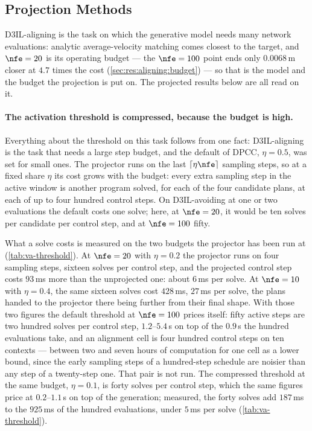 \subsection{Projection Methods}\label{sec:res:aligning:projection}

D3IL-aligning is the task on which the generative model needs many network evaluations: analytic
average-velocity matching comes closest to the target, and $\nfe=20$ is its operating budget --- the
$\nfe=100$ point ends only $0.0068$\,m closer at $4.7$ times the cost (\autoref{sec:res:aligning:budget})
--- so that is the model and the budget the projection is put on. The projected results below are all read
on it.

\paragraph{The activation threshold is compressed, because the budget is high.}
Everything about the threshold on this task follows from one fact: D3IL-aligning is the task that needs a
large step budget, and the default of \ac{DPCC}, $\eta=0.5$, was set for small ones. The projector runs
on the last $\lceil \eta\nfe \rceil$ sampling steps, so at a fixed share $\eta$ its cost grows with the
budget: every extra sampling step in the active window is another program solved, for each of the four
candidate plans, at each of up to four hundred control steps. On D3IL-avoiding at one or two evaluations
the default costs one solve; here, at $\nfe=20$, it would be ten solves per candidate per control step,
and at $\nfe=100$ fifty.

What a solve costs is measured on the two budgets the projector has been run at
(\autoref{tab:va-threshold}). At $\nfe=20$ with $\eta=0.2$ the projector runs on four sampling steps,
sixteen solves per control step, and the projected control step costs $93$\,ms more than the unprojected
one: about $6$\,ms per solve. At $\nfe=10$ with $\eta=0.4$, the same sixteen solves cost $428$\,ms,
$27$\,ms per solve, the plans handed to the projector there being further from their final shape. With
those two figures the default threshold at $\nfe=100$ prices itself: fifty active steps are two hundred
solves per control step, $1.2$--$5.4$\,s on top of the $0.9$\,s the hundred evaluations take, and an
alignment cell is four hundred control steps on ten contexts --- between two and seven hours of computation
for one cell as a lower bound, since the early sampling steps of a hundred-step schedule are noisier than
any step of a twenty-step one. That pair is not run. The compressed threshold at the same budget,
$\eta=0.1$, is forty solves per control step, which the same figures price at $0.2$--$1.1$\,s on top of the
generation; measured, the forty solves add $187$\,ms to the $925$\,ms of the hundred evaluations, under
$5$\,ms per solve (\autoref{tab:va-threshold}).

